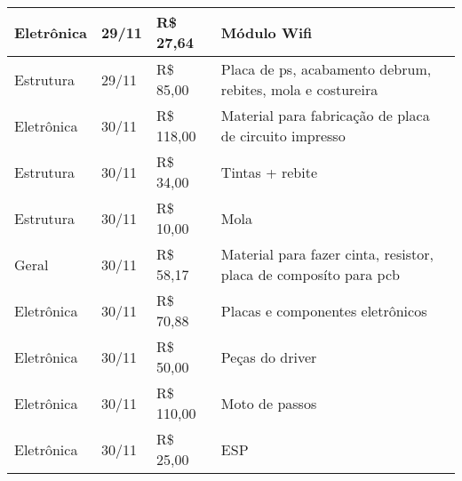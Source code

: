 \begin{table}[htp]
\begin{tabular}{|l|l|l|l|}
Eletrônica & 29/11 & R\$ 27,64 & Módulo Wifi \\ \hline
Estrutura & 29/11 & R\$ 85,00 & Placa de ps, acabamento debrum, rebites, mola e costureira \\ \hline
Eletrônica & 30/11 & R\$ 118,00 & Material para fabricação de placa de circuito impresso \\ \hline
Estrutura & 30/11 & R\$ 34,00 & Tintas + rebite \\ \hline
Estrutura & 30/11 & R\$ 10,00 & Mola \\ \hline
Geral & 30/11 & R\$ 58,17 & Material para fazer cinta, resistor, placa de composíto para pcb \\ \hline
Eletrônica & 30/11 & R\$ 70,88 & Placas e componentes eletrônicos \\ \hline
Eletrônica & 30/11 & R\$ 50,00 & Peças do driver \\ \hline
Eletrônica & 30/11 & R\$ 110,00 & Moto de passos \\ \hline
Eletrônica & 30/11 & R\$ 25,00 & ESP \\ \hline
\end{tabular}
\end{table}